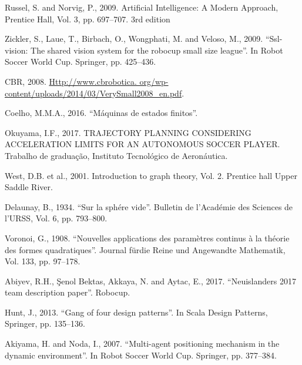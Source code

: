 \documentclass[conference]{IEEEtran}
\begin{document}
\begin{thebibliography}{00}
 Russel, S. and Norvig, P., 2009. Artificial Intelligence: A Modern Approach, Prentice Hall, Vol. 3, pp. 697–707. 3rd edition

 Zickler, S., Laue, T., Birbach, O., Wongphati, M. and Veloso, M., 2009. “Ssl-vision: The shared vision system for the
robocup small size league”. In Robot Soccer World Cup. Springer, pp. 425–436.

 CBR, 2008. \url{Http://www.cbrobotica. org/wp-content/uploads/2014/03/VerySmall2008_en.pdf}.

 Coelho, M.M.A., 2016. “Máquinas de estados finitos”.

 Okuyama, I.F., 2017. TRAJECTORY PLANNING CONSIDERING ACCELERATION LIMITS FOR AN AUTONOMOUS SOCCER PLAYER. Trabalho de graduação, Instituto Tecnológico de Aeronáutica.

 West, D.B. et al., 2001. Introduction to graph theory, Vol. 2. Prentice hall Upper Saddle River.

 Delaunay, B., 1934. “Sur la sphére vide”. Bulletin de l’Académie des Sciences de l’URSS, Vol. 6, pp. 793–800.

 Voronoi, G., 1908. “Nouvelles applications des paramètres continus à la théorie des formes quadratiques”. Journal fürdie Reine und Angewandte Mathematik, Vol. 133, pp. 97–178.

 Abiyev, R.H., Şenol Bektas, Akkaya, N. and Aytac, E., 2017. “Neuislanders 2017 team description paper”. Robocup.

 Hunt, J., 2013. “Gang of four design patterns”. In Scala Design Patterns, Springer, pp. 135–136.

 Akiyama, H. and Noda, I., 2007. “Multi-agent positioning mechanism in the dynamic environment”. In Robot Soccer World Cup. Springer, pp. 377–384.

\end{thebibliography}
\end{document}
